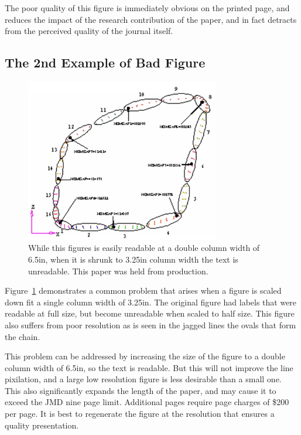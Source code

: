 \documentclass[twocolumn,10pt]{asme2ej}
\begin{document}
The poor quality of this figure is immediately obvious on the printed page, and reduces the impact of the research contribution of the paper, and in fact detracts from the perceived quality of the journal itself.



\subsection{The 2nd Example of Bad Figure}

\begin{figure} 
\centerline{\includegraphics[width=3.34in]{figure/FMANU_MD_05_1272_5.jpg}}
\caption{While this figures is easily readable at a double column width of 6.5in, when it is shrunk to 3.25in column width the text is unreadable. This paper was held from production.}
\label{fig_example2.jpg}
\end{figure}

Figure~\ref{fig_example2.jpg}
demonstrates a common problem that arises when a figure is scaled down fit a single column width of 3.25in.  The original figure had labels that were readable at full size, but become unreadable when scaled to half size.  This figure also suffers from poor resolution as is seen in the jagged lines the ovals that form the chain.

This problem can be addressed by increasing the size of the figure to a double column width of 6.5in, so the text is readable.  But this will not improve the line pixilation, and a large low resolution figure is less desirable than a small one.  This also significantly expands the length of the paper, and may cause it to exceed the JMD nine page limit.  Additional pages require page charges of \$200 per page.  It is best to regenerate the figure at the resolution that ensures a quality presentation.
\end{document}
